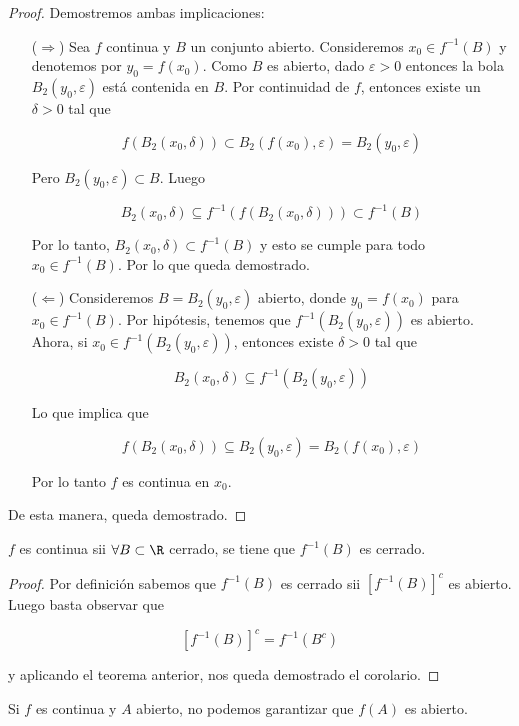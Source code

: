 \begin{proof}
    Demostremos ambas implicaciones:
    
    \begin{enumerate}
        \item[($\Rightarrow$)] Sea $f$ continua y $B$ un conjunto abierto. Consideremos $x_0 \in f^{-1}(B)$ y denotemos por $y_0 = f(x_0)$. Como $B$ es abierto, dado $\varepsilon > 0$ entonces la bola $B_2(y_0, \varepsilon)$ está contenida en $B$. Por continuidad de $f$, entonces existe un $\delta > 0$ tal que
        
        \[
        f\left( B_2(x_0, \delta) \right) \subset B_2(f(x_0), \varepsilon) = B_2(y_0, \varepsilon)
        \]
        
        Pero $B_2(y_0, \varepsilon) \subset B$. Luego
        
        \[
        B_2(x_0, \delta) \subseteq f^{-1}\left( f(B_2(x_0, \delta)) \right) \subset f^{-1}(B)
        \]
        
        Por lo tanto, $B_2(x_0, \delta) \subset f^{-1}(B)$ y esto se cumple para todo $x_0 \in f^{-1}(B)$. Por lo que queda demostrado.
        
        \item[($\Leftarrow$)] Consideremos $B = B_2(y_0, \varepsilon)$ abierto, donde $y_0 = f(x_0)$ para $x_0 \in f^{-1}(B)$. Por hipótesis, tenemos que $f^{-1}\left( B_2(y_0, \varepsilon) \right)$ es abierto. Ahora, si $x_0 \in f^{-1}\left( B_2(y_0, \varepsilon) \right)$, entonces existe $\delta > 0$ tal que
        
        \[
        B_2(x_0, \delta) \subseteq f^{-1}\left( B_2(y_0, \varepsilon) \right)
        \]
        
        Lo que implica que
        
        \[
        f\left( B_2(x_0, \delta) \right) \subseteq B_2(y_0, \varepsilon) = B_2\left(f(x_0), \varepsilon \right)
        \]
        
        Por lo tanto $f$ es continua en $x_0$.
    \end{enumerate}
    
    De esta manera, queda demostrado.
\end{proof}

\begin{cor}
    $f$ es continua sii $\forall B \subset \R$ cerrado, se tiene que $f^{-1}(B)$ es cerrado.
\end{cor}

\begin{proof}
    Por definición sabemos que $f^{-1}(B)$ es cerrado sii $[f^{-1}(B)]^c$ es abierto. Luego basta observar que
    
    \[
    [f^{-1}(B)]^c = f^{-1}(B^c)
    \]
    
    \noindent y aplicando el teorema anterior, nos queda demostrado el corolario.
\end{proof}

\begin{aco}
    Si $f$ es continua y $A$ abierto, no podemos garantizar que $f(A)$ es abierto.
\end{aco}